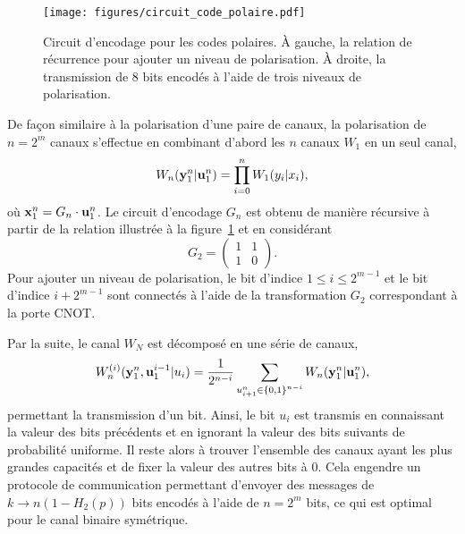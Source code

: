 \begin{figure}
  \begin{center}
    \texttt{[image: figures/circuit\_code\_polaire.pdf]}
  \end{center}
  \caption[Circuit des codes polaires]{
    Circuit d'encodage pour les codes polaires.
    À gauche, la relation de récurrence pour ajouter un niveau de polarisation.
    À droite, la transmission de 8 bits encodés à l'aide de trois niveaux de polarisation.
  }
  \label{fig:circuit_code_polaire}
\end{figure}

De façon similaire à la polarisation d'une paire de canaux,
la polarisation de $n = 2^m$ canaux s'effectue en combinant
d'abord les $n$ canaux $W_1$ en un seul canal,
\begin{equation}
  W_n(\vb y_1^n | \vb u_1^n) = \prod_{i=0}^n W_1(y_i | x_i),
\end{equation}
où $\vb x_1^n = G_n \cdot \vb u_1^n$.
Le circuit d'encodage $G_n$ est obtenu de manière récursive à partir de la relation illustrée
à la figure~\ref{fig:circuit_code_polaire} et en considérant 
\begin{equation}
  G_2 = 
  \begin{pmatrix}
    1 & 1 \\
    1 & 0
  \end{pmatrix}.
\end{equation}
Pour ajouter un niveau de polarisation,
le bit d'indice $1 \leq i \leq 2^{m-1}$ et le bit 
d'indice $i + 2^{m-1}$ sont connectés à l'aide de la
transformation $G_2$ correspondant à la porte CNOT.

Par la suite,
le canal $W_N$ est décomposé en une série de canaux,
\begin{equation}
  W_n^{(i)}(\vb y_1^n, \vb u_1^{i - 1} | u_i) 
  = \frac{1}{2^{n - i}}
  \sum_{u_{i+1}^n \in \qty{0, 1}^{n - i}} W_n(\vb y_1^n | \vb u_1^n),
  \label{eq:canal_polarise}
\end{equation}
permettant la transmission d'un bit.
Ainsi, 
le bit $u_i$ est transmis en connaissant la valeur des bits précédents et en 
ignorant la valeur des bits suivants de probabilité uniforme.
Il reste alors à trouver l'ensemble des canaux ayant les plus grandes capacités
et de fixer la valeur des autres bits à 0.
Cela engendre un protocole de communication permettant d'envoyer des messages de
$k \to n(1 - H_2(p))$ bits encodés à l'aide de $n = 2^m$ bits, ce qui est optimal pour le 
canal binaire symétrique.

